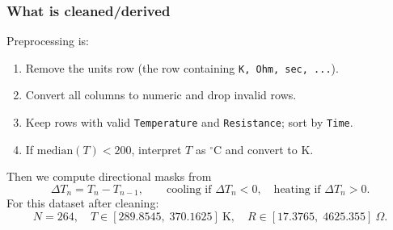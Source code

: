 \documentclass[11pt]{article}
\begin{document}
\begin{table}[htbp]
\centering
\scriptsize
\caption{Representative rows from the experimental dataset (actual values).}
\label{tab:fit_data_sample}
\end{table}

\subsubsection*{What is cleaned/derived}
Preprocessing is:
\begin{enumerate}
    \item Remove the units row (the row containing \texttt{K, Ohm, sec, ...}).
    \item Convert all columns to numeric and drop invalid rows.
    \item Keep rows with valid \texttt{Temperature} and \texttt{Resistance}; sort by \texttt{Time}.
    \item If \(\mathrm{median}(T)<200\), interpret \(T\) as \(^\circ\mathrm{C}\) and convert to K.
\end{enumerate}
Then we compute directional masks from
\begin{equation}
\Delta T_n = T_n - T_{n-1},
\qquad
\text{cooling if }\Delta T_n<0,\quad
\text{heating if }\Delta T_n>0.
\label{eq:fit_dt_sign}
\end{equation}
For this dataset after cleaning:
\[
N=264,\quad
T\in[289.8545,\;370.1625]\ \mathrm{K},\quad
R\in[17.3765,\;4625.355]\ \Omega.
\]
\end{document}
